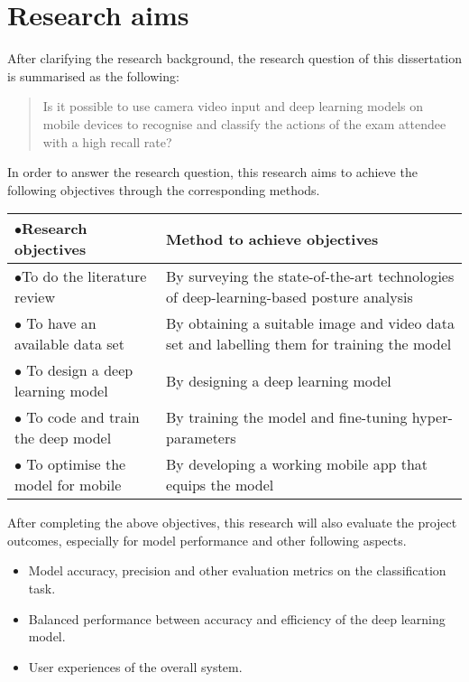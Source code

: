 \section{Research aims}
\label{sec:Research aims}
After clarifying the research background, the research question of this dissertation is summarised as the following:

\begin{quote}
    Is it possible to use camera video input and deep learning models on mobile devices to recognise and classify the actions of the exam attendee with a high recall rate?
\end{quote}

In order to answer the research question, this research aims to achieve the following objectives through the corresponding methods.

\begin{longtable}{>{\hspace*{-0.3cm}$\bullet$\hspace*{0.2cm}}p{}p{}}
\textbf{Research objectives} & \textbf{Method to achieve objectives} \\ \hline
To do the literature review & By surveying the state-of-the-art technologies of deep-learning-based posture analysis \\ \hline
To have an available data set & By obtaining a suitable image and video data set and labelling them for training the model \\ \hline
To design a deep learning model & By designing a deep learning model \\ \hline
To code and train the deep model & By training the model and fine-tuning hyper-parameters \\ \hline
To optimise the model for mobile & By developing a working mobile app that equips the model \\ 
\end{longtable}

After completing the above objectives, this research will also evaluate the project outcomes, especially for model performance and other following aspects.

\begin{itemize}
    \item Model accuracy, precision and other evaluation metrics on the classification task.
    \item Balanced performance between accuracy and efficiency of the deep learning model.
    \item User experiences of the overall system.
\end{itemize}
